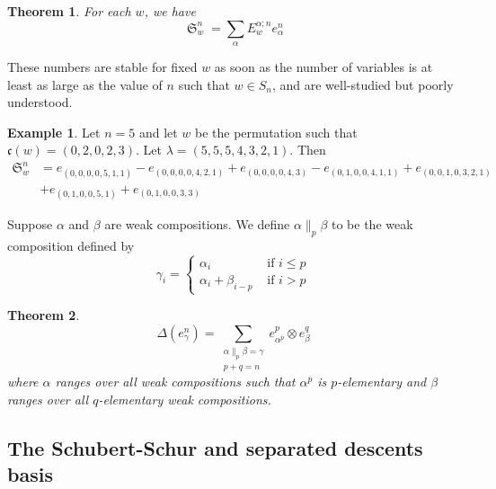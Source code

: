 \documentclass{amsart}
\newtheorem{theorem}{Theorem}[section]
\theoremstyle{definition}
\newtheorem{example}[lemma]{Example}
\theoremstyle{remark}
\numberwithin{equation}{subsection}
\DeclareMathOperator{\sch}{\mathfrak{S}}
\newcommand{\code}{\mathfrak{c}}
\begin{document}
\begin{theorem}
	For each $w$, we have
	$$\sch_w^n = \sum_{\alpha}E_w^{\alpha;n}e_{\alpha}^n$$
\end{theorem}
These numbers are stable for fixed $w$ as soon as the number of variables is at least as large as the value of $n$ such that $w\in S_n$, and are well-studied but poorly understood.

\begin{example}
	Let $n=5$ and let $w$ be the permutation such that $\code(w)=(0,2,0,2,3)$. Let $\lambda = (5,5,5,4,3,2,1)$. Then
	\begin{align*}
		\sch_w^n &= e_{(0,0,0,0,5,1,1)} - e_{(0,0,0,0,4,2,1)} + e_{(0,0,0,0,4,3)}- e_{(0,1,0,0,4,1,1)} +e_{(0,0,1,0,3,2,1)}\\
		&+e_{(0,1,0,0,5,1)} + e_{(0,1,0,0,3,3)}
	\end{align*}
\end{example}



Suppose $\alpha$ and $\beta$ are weak compositions. We define $\alpha\|_p \beta$ to be the weak composition defined by
$$\gamma_i = \begin{cases}
	\alpha_i&\mbox{ if }i\leq p\\
	\alpha_i + \beta_{i-p}&\mbox{ if }i> p
\end{cases}$$

\begin{theorem}
	$$\Delta(e_\gamma^n) = \sum_{\substack{\alpha \|_p \beta=\gamma\\p+q=n}} e_{\alpha^{\overline{p}}}^p\otimes e_\beta^q$$
	where $\alpha$ ranges over all weak compositions such that $\alpha^{\overline{p}}$ is $p$-elementary and $\beta$ ranges over all $q$-elementary weak compositions.
\end{theorem}

\subsection{The Schubert-Schur and separated descents basis}

\end{document}
